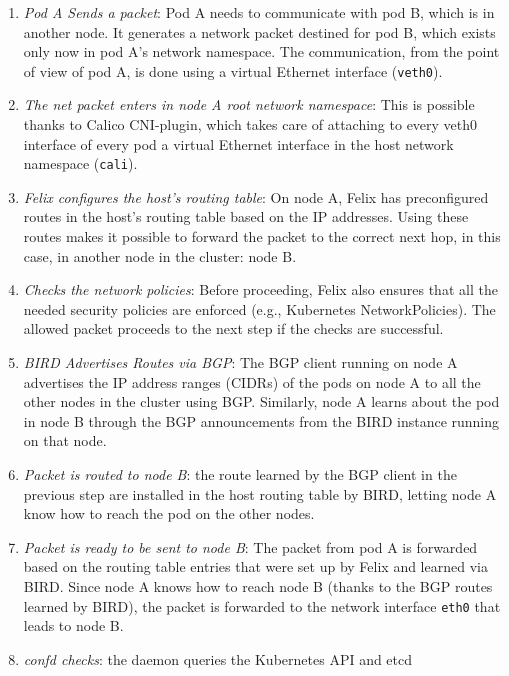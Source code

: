 \begin{enumerate}
  \item \textit{Pod A Sends a packet}: Pod A needs to communicate with pod B,
    which is in another node. It generates a network packet destined for pod B,
    which exists only now in pod A's network namespace. The communication, from
    the point of view of pod A, is done using a virtual Ethernet interface
    (\texttt{veth0}).
  \item \textit{The net packet enters in node A root network namespace}: This is
    possible thanks to Calico CNI-plugin, which takes care of attaching to every
    veth0 interface of every pod a virtual Ethernet interface in the host
    network namespace (\texttt{cali}).
  \item \textit{Felix configures the host's routing table}: On node A, Felix has
    preconfigured routes in the host's routing table based on the IP addresses.
    Using these routes makes it possible to forward the packet to the correct
    next hop, in this case, in another node in the cluster: node B.
  \item \textit{Checks the network policies}: Before proceeding, Felix also
    ensures that all the needed security policies are enforced (e.g., Kubernetes
    NetworkPolicies). The allowed packet proceeds to the next step if the checks
    are successful.
  \item \textit{BIRD Advertises Routes via BGP}: The BGP client running on node
    A advertises the IP address ranges (CIDRs) of the pods on node A to all the
    other nodes in the cluster using BGP. Similarly, node A learns about the pod
    in node B through the BGP announcements from the BIRD instance running on
    that node.
  \item \textit{Packet is routed to node B}: the route learned by the BGP
    client in the previous step are installed in the host routing table by BIRD,
    letting node A know how to reach the pod on the other nodes.
  \item \textit{Packet is ready to be sent to node B}: The packet from pod A is
    forwarded based on the routing table entries that were set up by Felix and
    learned via BIRD. Since node A knows how to reach node B (thanks to the BGP
    routes learned by BIRD), the packet is forwarded to the network interface
    \texttt{eth0} that leads to node B.
  \item \textit{confd checks}: the daemon queries the Kubernetes API and etcd

\end{enumerate}

